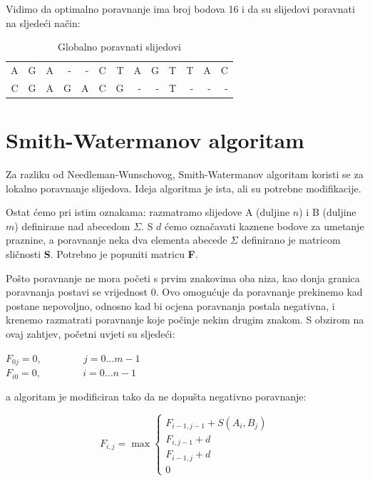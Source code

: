 \documentclass[times, utf8, zavrsni, numeric]{fer}
\begin{document}
Vidimo da optimalno poravnanje ima broj bodova 16 i da su slijedovi poravnati na sljedeći način:

\begin{table}[h]
\begin{center}
\begin{tabular}{r r r r r r r r r r r r r}
A & G & A & - & - & C & T & A & G & T & T & A & C \\
C & G & A & G & A & C & G & - & - & T & - & - & - \\
\end{tabular}
\end{center}
\caption{Globalno poravnati slijedovi}
\label{table:nwporavnanje}
\end{table}

\section{Smith-Watermanov algoritam}
\indent

Za razliku od Needleman-Wunschovog, Smith-Watermanov algoritam koristi se za lokalno poravnanje slijedova. Ideja algoritma je ista, ali su potrebne modifikacije.

Ostat ćemo pri istim oznakama: razmatramo slijedove A (duljine $n$) i B (duljine $m$) definirane nad abecedom $\Sigma$. S $d$ ćemo označavati kaznene bodove za umetanje praznine, a poravnanje neka dva elementa abecede $\Sigma$ definirano je matricom sličnosti \textbf{S}. Potrebno je popuniti matricu \textbf{F}.

Pošto poravnanje ne mora početi s prvim znakovima oba niza, kao donja granica poravnanja postavi se vrijednost 0. Ovo omogućuje da poravnanje prekinemo kad postane nepovoljno, odnosno kad bi ocjena poravnanja postala negativna, i krenemo razmatrati poravnanje koje počinje nekim drugim znakom. S obzirom na ovaj zahtjev, početni uvjeti su sljedeći:
\begin{center}
$F_{0j} = 0,\hspace{50pt} j = 0...m - 1$\\
$F_{i0} = 0,\hspace{50pt} i = 0...n - 1$
\end{center}
a algoritam je modificiran tako da ne dopušta negativno poravnanje:
\begin{center}
\begin{equation}
F_{i,j} = \max \left\{
	\begin{array}{lr}
		F_{i-1,j-1} + S(A_{i}, B_{j}) \\
		F_{i, j-1} + d \\
		F_{i-1, j} + d \\
		0
	\end{array}
\right.
\end{equation}
\end{center}
\end{document}
